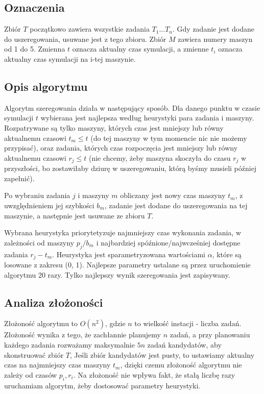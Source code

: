 \documentclass[11pt]{article}
\begin{document}
\subsection{Oznaczenia}

Zbiór $T$ początkowo zawiera wszystkie zadania $T_1 \dots T_n$. Gdy zadanie jest dodane do uszeregowania, usuwane jest z tego zbioru.
Zbiór $M$ zawiera numery maszyn od 1 do 5.
Zmienna $t$ oznacza aktualny czas symulacji, a zmienne $t_i$ oznacza aktualny czas symulacji na i-tej maszynie.

\subsection{Opis algorytmu}

Algorytm szeregowania działa w następujący sposób. Dla danego punktu w czasie symulacji $t$ wybierana jest najlepsza według heurystyki para zadania i maszyny. Rozpatrywane są tylko maszyny, których czas jest mniejszy lub równy aktualnemu czasowi $t_m \leq t$ (do tej maszyny w tym momencie nic nie możemy przypisać), oraz zadania, których czas rozpoczęcia jest mniejszy lub równy aktualnemu czasowi $r_j \leq t$ (nie chcemy, żeby maszyna skoczyła do czasu $r_j$ w przyszłości, bo zostawiłaby dziurę w uszeregowaniu, którą byśmy musieli później zapełnić).

Po wybraniu zadania $j$ i maszyny $m$ obliczany jest nowy czas maszyny $t_m$, z uwzględnieniem jej szybkości $b_m$, zadanie jest dodane do uszeregowania na tej maszynie, a następnie jest usuwane ze zbioru $T$.

Wybrana heurystyka priorytetyzuje najmniejszy czas wykonania zadania, w zależności od maszyny $p_j/b_m$ i najbardziej spóźnione/najwcześniej dostępne zadania $r_j - t_m$. Heurystyka jest sparametryzowana wartościami $\alpha$, które są losowane z zakresu (0, 1). Najlepsze parametry ustalane są przez uruchomienie algorytmu 20 razy. Tylko najlepszy wynik szeregowania jest zapisywany.

\subsection{Analiza złożoności}

Złożoność algorytmu to $O(n^2)$, gdzie $n$ to wielkość instacji - liczba zadań. Złożoność wynika z tego, że zachłannie planujemy $n$ zadań, a przy planowaniu każdego zadania rozważamy maksymalnie $5n$ zadań kandydatów, aby skonstruować zbiór $T$, Jeśli zbiór kandydatów jest pusty, to ustawiamy aktualny czas na najmniejszy czas maszyny $t_m$, dzięki czemu złożoność algorytmu nie zależy od czasów $p_i, r_i$. Na złożoność nie wpływa fakt, że stałą liczbę razy uruchamiam algorytm, żeby dostosować parametry heurystyki. 
\end{document}
